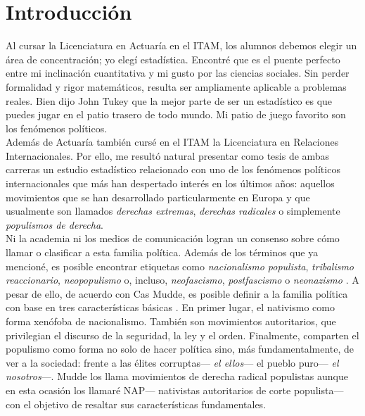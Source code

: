 \chapter*{Introducción}

Al cursar la Licenciatura en Actuaría en el ITAM, los alumnos debemos elegir un área de concentración; yo elegí estadística. Encontré que es el puente perfecto entre mi inclinación cuantitativa y mi gusto por las ciencias sociales. Sin perder formalidad y rigor matemáticos, resulta ser ampliamente aplicable a problemas reales. Bien dijo John Tukey que la mejor parte de ser un estadístico es que puedes jugar en el patio trasero de todo mundo. Mi patio de juego favorito son los fenómenos políticos.\\

Además de Actuaría también cursé en el ITAM la Licenciatura en Relaciones Internacionales. Por ello, me resultó natural presentar como tesis de ambas carreras un estudio estadístico relacionado con uno de los fenómenos políticos internacionales que más han despertado interés en los últimos años: aquellos movimientos que se han desarrollado particularmente en Europa y que usualmente son llamados \textit{derechas extremas}, \textit{derechas radicales} o simplemente \textit{populismos de derecha}.\\ 

Ni la academia ni los medios de comunicación logran un consenso sobre cómo llamar o clasificar a esta familia política. Además de los términos que ya mencioné, es posible encontrar etiquetas como \textit{nacionalismo populista}, \textit{tribalismo reaccionario}, \textit{neopopulismo} o, incluso, \textit{neofascismo}, \textit{postfascismo} o \textit{neonazismo} \parencites{Mudde07a}{Mammone12}{Hainsworth16a}. A pesar de ello, de acuerdo con Cas Mudde, es posible definir a la familia política con base en tres características básicas \parencites{Mudde07a}{Beauchamp16a}. En primer lugar, el nativismo como forma xenófoba de nacionalismo. También son movimientos autoritarios, que privilegian el discurso de la seguridad, la ley y el orden. Finalmente, comparten el populismo como forma no solo de hacer política sino, más fundamentalmente, de ver a la sociedad: frente a las élites corruptas--- \textit{el ellos}--- el pueblo puro--- \textit{el nosotros}---. Mudde los llama movimientos de derecha radical populistas aunque en esta ocasión los llamaré NAP--- nativistas autoritarios de corte populista--- con el objetivo de resaltar sus características fundamentales.\\

